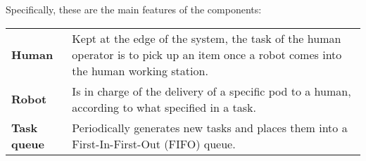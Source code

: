 Specifically, these are the main features of the components:

\begin{table}[h!]
\begin{tabularx}{\textwidth}{lX}
\textbf{Human} & Kept at the edge of the system, the task of the human operator is to pick up an item once a robot comes into the human working station.\vspace{0,2cm}\\
\textbf{Robot} & Is in charge of the delivery of a specific pod to a human, according to what specified in a task.\vspace{0,2cm}\\
\textbf{Task queue} & Periodically generates new tasks and places them into a First-In-First-Out (FIFO) queue.\vspace{0,2cm}\\
\end{tabularx}
\end{table}